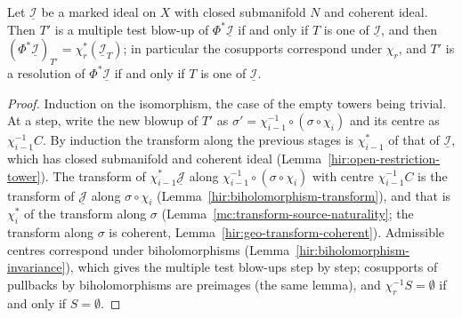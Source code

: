 \begin{lemma}
\label{mc:tower-isomorphism-transform}
\leanok
Let \(\underline{\mathcal I}\) be a marked ideal on \(X\) with closed submanifold \(N\) and coherent ideal. Then \(T'\) is a multiple test blow-up of
\(\Phi^*\underline{\mathcal I}\) if and only if \(T\) is one of \(\underline{\mathcal I}\), and then \((\Phi^*\underline{\mathcal I})_{T'}=\chi_r^*(\underline{\mathcal I}_T)\); in particular
the cosupports correspond under \(\chi_r\), and \(T'\) is a resolution of \(\Phi^*\underline{\mathcal I}\) if and only if \(T\) is one of \(\underline{\mathcal I}\).
\end{lemma}
\begin{proof}
\leanok
Induction on the isomorphism, the case of the empty towers being trivial. At a step, write the new blowup of \(T'\) as \(\sigma'=\chi_{i-1}^{-1}\circ(\sigma\circ\chi_i)\) and its centre
as \(\chi_{i-1}^{-1}C\). By induction the transform along the previous stages is \(\chi_{i-1}^*\) of that of \(\underline{\mathcal I}\), which has closed submanifold and
coherent ideal (Lemma~\ref{hir:open-restriction-tower}). The transform of \(\chi_{i-1}^*\underline{\mathcal J}\) along \(\chi_{i-1}^{-1}\circ(\sigma\circ\chi_i)\) with centre
\(\chi_{i-1}^{-1}C\) is the transform of \(\underline{\mathcal J}\) along \(\sigma\circ\chi_i\) (Lemma~\ref{hir:biholomorphism-transform}), and that is \(\chi_i^*\) of the
transform along \(\sigma\) (Lemma~\ref{mc:transform-source-naturality}; the transform along \(\sigma\) is coherent, Lemma~\ref{hir:geo-transform-coherent}). Admissible centres correspond
under biholomorphisms (Lemma~\ref{hir:biholomorphism-invariance}), which gives the multiple test blow-ups step by step; cosupports of pullbacks by
biholomorphisms are preimages (the same lemma), and \(\chi_r^{-1}S=\emptyset\) if and only if \(S=\emptyset\).
\end{proof}

